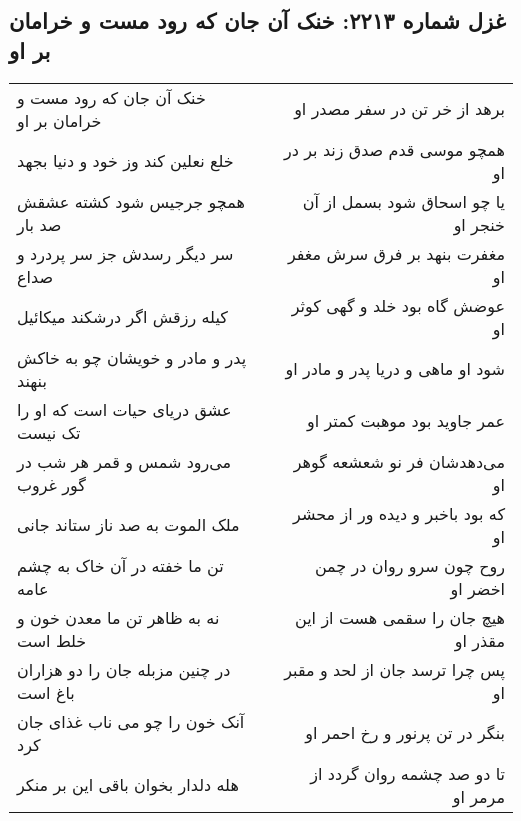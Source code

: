 \begin{center}
\section*{غزل شماره ۲۲۱۳: خنک آن جان که رود مست و خرامان بر او}
\label{sec:2213}
\begin{longtable}{l p{0.5cm} r}
خنک آن جان که رود مست و خرامان بر او
&&
برهد از خر تن در سفر مصدر او
\\
خلع نعلین کند وز خود و دنیا بجهد
&&
همچو موسی قدم صدق زند بر در او
\\
همچو جرجیس شود کشته عشقش صد بار
&&
یا چو اسحاق شود بسمل از آن خنجر او
\\
سر دیگر رسدش جز سر پردرد و صداع
&&
مغفرت بنهد بر فرق سرش مغفر او
\\
کیله رزقش اگر درشکند میکائیل
&&
عوضش گاه بود خلد و گهی کوثر او
\\
پدر و مادر و خویشان چو به خاکش بنهند
&&
شود او ماهی و دریا پدر و مادر او
\\
عشق دریای حیات است که او را تک نیست
&&
عمر جاوید بود موهبت کمتر او
\\
می‌رود شمس و قمر هر شب در گور غروب
&&
می‌دهدشان فر نو شعشعه گوهر او
\\
ملک الموت به صد ناز ستاند جانی
&&
که بود باخبر و دیده ور از محشر او
\\
تن ما خفته در آن خاک به چشم عامه
&&
روح چون سرو روان در چمن اخضر او
\\
نه به ظاهر تن ما معدن خون و خلط است
&&
هیچ جان را سقمی هست از این مقذر او
\\
در چنین مزبله جان را دو هزاران باغ است
&&
پس چرا ترسد جان از لحد و مقبر او
\\
آنک خون را چو می ناب غذای جان کرد
&&
بنگر در تن پرنور و رخ احمر او
\\
هله دلدار بخوان باقی این بر منکر
&&
تا دو صد چشمه روان گردد از مرمر او
\\
\end{longtable}
\end{center}
